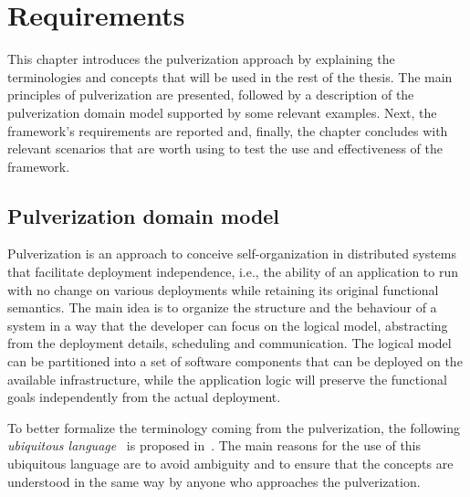 \chapter{Requirements}
\label{chap:requirements}

This chapter introduces the pulverization approach by explaining the terminologies and concepts that will be used in the rest of the thesis.
The main principles of pulverization are presented, followed by a description of the pulverization domain model supported by some relevant examples.
Next, the framework's requirements are reported and, finally, the chapter concludes with relevant scenarios that are worth using to test the use and
effectiveness of the framework.

\section{Pulverization domain model}
\label{sec:pulverization-domain-model}

Pulverization is an approach to conceive self-organization in distributed systems that facilitate deployment independence, i.e., the ability of an
application to run with no change on various deployments while retaining its original functional semantics.
The main idea is to organize the structure and the behaviour of a system in a way that the developer can focus on the logical model, abstracting from
the deployment details, scheduling and communication.
The logical model can be partitioned into a set of software components that can be deployed on the available infrastructure, while the application
logic will preserve the functional goals independently from the actual deployment.

To better formalize the terminology coming from the pulverization, the following \emph{ubiquitous language}~\cite{evans2004ddd} is proposed
in~.
The main reasons for the use of this ubiquitous language are to avoid ambiguity and to ensure that the concepts are understood in the same way by
anyone who approaches the pulverization.

